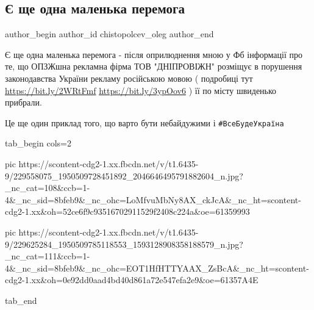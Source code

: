  
 
 
 
 
 
\subsection{Є ще одна маленька перемога}
\label{sec:03_08_2021.fb.chistopolcev_oleg.1.peremoga_banner}
 
\ifcmt
 author_begin
   author_id chistopolcev_oleg
 author_end
\fi

Є ще одна маленька перемога - після оприлюднення мною у Фб інформації про те,
що ОПЗЖшна рекламна фірма ТОВ "ДНІПРОВІЖН" розміщує в порушення законодавства
України рекламу російською мовою ( подробиці тут \url{https://bit.ly/2WRtFmf}
\url{https://bit.ly/3ypOov6} ) її по місту швиденько прибрали.

Це ще один приклад того, що варто бути небайдужими і \verb|#ВсеБудеУкраїна|

\ifcmt
  tab_begin cols=2

     pic https://scontent-cdg2-1.xx.fbcdn.net/v/t1.6435-9/229558075_1950509728451892_2046646495791882604_n.jpg?_nc_cat=108&ccb=1-4&_nc_sid=8bfeb9&_nc_ohc=LoMfvuMbNy8AX_ckJcA&_nc_ht=scontent-cdg2-1.xx&oh=52ce6f9c93516702911529f2408c224a&oe=61359993

     pic https://scontent-cdg2-1.xx.fbcdn.net/v/t1.6435-9/229625284_1950509785118553_1593128908358188579_n.jpg?_nc_cat=111&ccb=1-4&_nc_sid=8bfeb9&_nc_ohc=EOT1HfHTTYAAX_ZsBcA&_nc_ht=scontent-cdg2-1.xx&oh=0e92dd0aad4bd40d861a72e547efa2e9&oe=61357A4E

  tab_end
\fi

